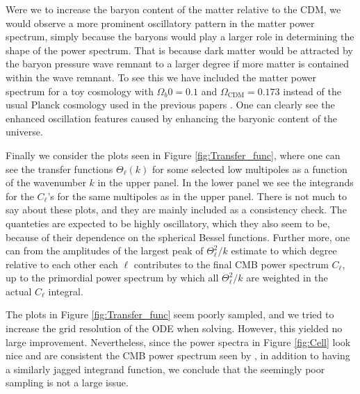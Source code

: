 \documentclass[twocolumn]{aastex62}
\begin{document}
Were we to increase the baryon content of the matter relative to the CDM, we would observe a more prominent oscillatory pattern in the matter power spectrum, simply because the baryons would play a larger role in determining the shape of the power spectrum. That is because dark matter would be attracted by the baryon pressure wave remnant to a larger degree if more matter is contained within the wave remnant. To see this we have included the matter power spectrum for a toy cosmology with $\Omega_b0 = 0.1$ and $\Omega_\mathrm{CDM} = 0.173$ instead of the usual Planck cosmology used in the previous papers \cite{stutzer:2020a, stutzer:2020b, stutzer:2020c}. One can clearly see the enhanced oscillation features caused by enhancing the baryonic content of the universe.

Finally we consider the plots seen in Figure \ref{fig:Transfer_func}, where one can see the transfer functions $\Theta_\ell(k)$ for some selected low multipoles as a function of the wavenumber $k$ in the upper panel. In the lower panel we see the integrands for the $C_\ell$'s for the same multipoles as in the upper panel. There is not much to say about these plots, and they are mainly included as a consistency check. The quanteties are expected to be highly oscillatory, which they also seem to be, because of their dependence on the spherical Bessel functions. Further more, one can from the amplitudes of the largest peak of $\Theta_\ell^2 / k$ estimate to which degree relative to each other each $\ell$ contributes to the final CMB power spectrum $C_\ell$, up to the primordial power spectrum by which all $\Theta_\ell^2/k$ are weighted in the actual $C_\ell$ integral. 

The plots in Figure \ref{fig:Transfer_func} seem poorly sampled, and we tried to increase the grid resolution of the ODE when solving. However, this yielded no large improvement. Nevertheless, since the power spectra in Figure \ref{fig:Cell} look nice and are consistent the CMB power spectrum seen by \cite{callin:2006}, in addition to \cite{callin:2006} having a similarly jagged integrand function, we conclude that the seemingly poor sampling is not a large issue.

\newpage
\end{document}
